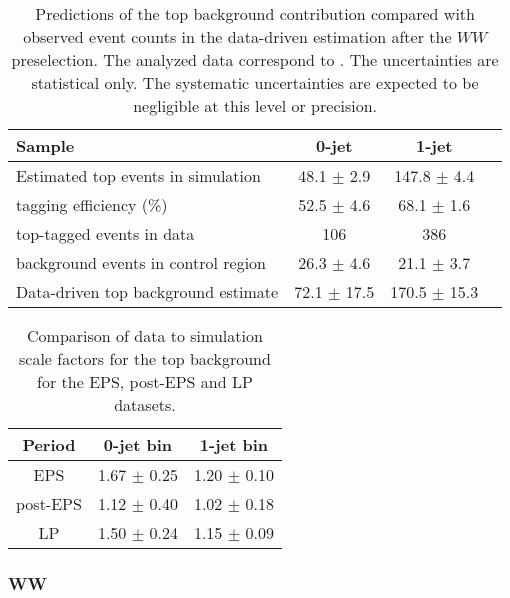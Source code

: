\begin{table}[!htbp]
\begin{center}
\begin{tabular}{l c c c}
\hline
Sample                                        &   0-jet          & 1-jet          \\
\hline
Estimated top events in simulation  	      &  48.1 $\pm$ 2.9  & 147.8 $\pm$ 4.4 \\
tagging efficiency (\%)                       &  52.5 $\pm$ 4.6  &  68.1 $\pm$ 1.6 \\
top-tagged events in data           	      &          106     &    386          \\
background events in control region           &  26.3 $\pm$ 4.6  &  21.1 $\pm$ 3.7 \\
Data-driven top background estimate           &  72.1 $\pm$ 17.5 & 170.5 $\pm$ 15.3\\
\hline
\end{tabular}
\caption{Predictions of the top background contribution compared 
with observed event counts in the data-driven estimation after the $WW$ preselection. 
The analyzed data correspond to \lpintlumi.
The uncertainties are statistical only. The systematic uncertainties are expected to be 
negligible at this level or precision.}
\label{tab:lp_ttbar_est}
\end{center}
\end{table}

\begin{table}[!htbp]
\begin{center}
\begin{tabular}{c c c} 
\hline
Period & 0-jet bin & 1-jet bin \\ 
\hline
EPS      & 1.67 $\pm$ 0.25 & 1.20 $\pm$ 0.10 \\
post-EPS & 1.12 $\pm$ 0.40 & 1.02 $\pm$ 0.18 \\
LP       & 1.50 $\pm$ 0.24 & 1.15 $\pm$ 0.09 \\
\hline
\end{tabular}
\caption{Comparison of data to simulation scale factors for the top background for the EPS, post-EPS and LP datasets.}
\label{tab:lp_periods_top}
\end{center}
\end{table}

\subsubsection{WW}

